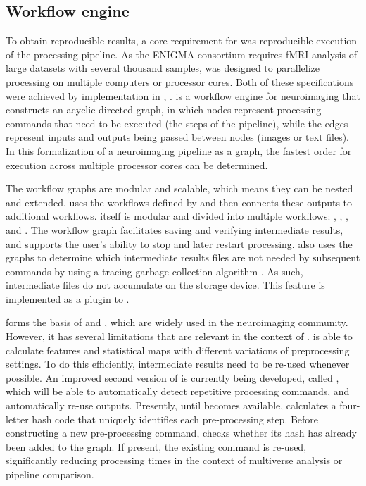 \subsection{Workflow engine}

To obtain reproducible results, a core requirement for  was reproducible execution of the processing pipeline. As the ENIGMA consortium requires fMRI analysis of large datasets with several thousand samples,  was designed to parallelize processing on multiple computers or processor cores. Both of these specifications were achieved by implementation in ,  \parencite{gorgolewski2011}.  is a workflow engine for neuroimaging that constructs an acyclic directed graph, in which nodes represent processing commands that need to be executed (the steps of the pipeline), while the edges represent inputs and outputs being passed between nodes (images or text files). In this formalization of a neuroimaging pipeline as a graph, the fastest order for execution across multiple processor cores can be determined.

The workflow graphs are modular and scalable, which means they can be nested and extended.  uses the workflows defined by  and then connects these outputs to additional workflows.  itself is modular and divided into multiple workflows:  \parencite{esteban2021b},  \parencite{esteban2020a},  \parencite{esteban2021a}, and  \parencite{goncalves2021}. The workflow graph facilitates saving and verifying intermediate results, and supports the user's ability to stop and later restart processing.  also uses the graphs to determine which intermediate results files are not needed by subsequent commands by using a tracing garbage collection algorithm \parencite{dijkstra1978}. As such, intermediate files do not accumulate on the storage device. This feature is implemented as a plugin to .

 forms the basis of  and , which are widely used in the neuroimaging community. However, it has several limitations that are relevant in the context of .  is able to calculate features and statistical maps with different variations of preprocessing settings. To do this efficiently, intermediate results need to be re-used whenever possible. An improved second version of  is currently being developed, called  \parencite{jarecka2020}, which will be able to automatically detect repetitive processing commands, and automatically re-use outputs. Presently, until  becomes available,  calculates a four-letter hash code that uniquely identifies each pre-processing step. Before constructing a new pre-processing command,  checks whether its hash has already been added to the graph. If present, the existing command is re-used, significantly reducing processing times in the context of multiverse analysis or pipeline comparison.

